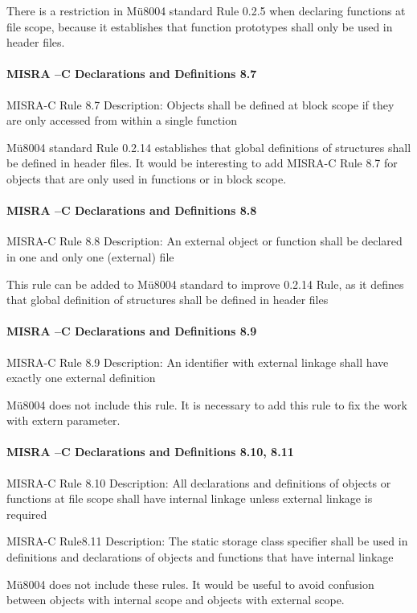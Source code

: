 There is a restriction in Mü8004 standard Rule 0.2.5 when declaring functions at file scope, because it establishes that function prototypes shall only be used in header files.

\paragraph{MISRA –C Declarations and Definitions 8.7}
MISRA-C Rule 8.7 Description: Objects shall be defined at block scope if they are only accessed from within a single function

Mü8004 standard Rule 0.2.14 establishes that global definitions of structures shall be defined in header files. It would be interesting to add MISRA-C Rule 8.7 for objects that are only used in functions or in block scope.  

\paragraph{MISRA –C Declarations and Definitions 8.8}
MISRA-C Rule 8.8 Description: An external object or function shall be declared in one and only one (external) file

This rule can be added to Mü8004 standard to improve 0.2.14 Rule, as it defines that global definition of structures shall be defined in header files

\paragraph{MISRA –C Declarations and Definitions 8.9}
MISRA-C Rule 8.9 Description: An identifier with external linkage shall have exactly one external definition

Mü8004 does not include this rule. It is necessary to add this rule to fix the work with extern parameter.

\paragraph{MISRA –C Declarations and Definitions 8.10, 8.11}
MISRA-C Rule 8.10 Description: All declarations and definitions of objects or functions at file scope shall have internal linkage unless external linkage is required

MISRA-C Rule8.11 Description: The static storage class specifier shall be used in definitions and declarations of objects and functions that have internal linkage

Mü8004 does not include these rules. It would be useful to avoid confusion between objects with internal scope and objects with external scope.

